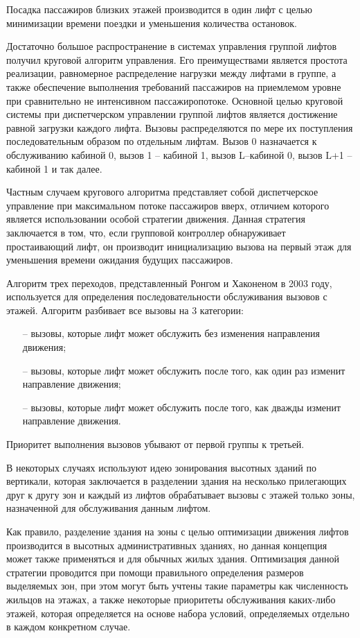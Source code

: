	Посадка пассажиров близких этажей производится в один лифт с целью минимизации времени поездки
		и уменьшения количества остановок.
		
	Достаточно большое распространение в системах управления группой лифтов получил круговой алгоритм управления.
		Его преимуществами является простота реализации, равномерное распределение нагрузки между лифтами в группе,
		а также обеспечение выполнения требований пассажиров на приемлемом уровне
		при сравнительно не интенсивном пассажиропотоке.
		Основной целью круговой системы при диспетчерском управлении группой лифтов является
		достижение равной загрузки каждого лифта. Вызовы распределяются по мере
		их поступления последовательным образом по отдельным лифтам.
		Вызов 0 назначается к обслуживанию кабиной 0, вызов 1 – кабиной 1, вызов L–кабиной 0,
		вызов L+1 – кабиной 1 и так далее.

	Частным случаем кругового алгоритма представляет собой диспетчерское управление
		при максимальном потоке пассажиров вверх, отличием которого является использовании
		особой стратегии движения. Данная стратегия заключается в том, что,
		если групповой контроллер обнаруживает простаивающий лифт,
		он производит инициализацию вызова на первый этаж для уменьшения времени ожидания будущих пассажиров.

	Алгоритм трех переходов, представленный Ронгом и Хаконеном в 2003 году,
		используется для определения последовательности обслуживания вызовов с этажей.
		Алгоритм разбивает все вызовы на 3 категории:
		\begin{itemize}
			\item[--] вызовы, которые лифт может обслужить без изменения направления движения;
			\item[--] вызовы, которые лифт может обслужить после того, как один раз изменит направление движения;
			\item[--] вызовы, которые лифт может обслужить после того, как дважды изменит направление движения.
		\end{itemize}
	
	Приоритет выполнения вызовов убывают от первой группы к третьей.
	
	В некоторых случаях используют идею зонирования высотных зданий по вертикали,
		которая заключается в разделении здания на несколько прилегающих друг к другу зон
		и каждый из лифтов обрабатывает вызовы с этажей только зоны, назначенной для обслуживания данным лифтом.

	Как правило, разделение здания на зоны с целью оптимизации движения
		лифтов производится в высотных административных зданиях,
		но данная концепция может также применяться и для обычных жилых здания.
		Оптимизация данной стратегии проводится при помощи правильного определения размеров выделяемых зон,
		при этом могут быть учтены такие параметры как численность жильцов на этажах,
		а также некоторые приоритеты обслуживания каких-либо этажей,
		которая определяется на основе набора условий, определяемых отдельно в каждом конкретном случае.


